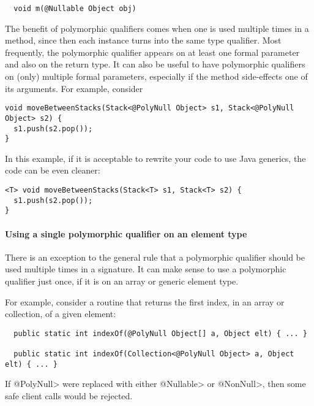 \begin{Verbatim}
  void m(@Nullable Object obj)
\end{Verbatim}

The benefit of polymorphic qualifiers comes when one is used multiple times
in a method, since then each instance turns into the same type qualifier.
Most frequently, the polymorphic qualifier appears on at least one formal
parameter and also on the return type.  It can also be useful to have
polymorphic qualifiers on (only) multiple formal parameters, especially if
the method side-effects one of its arguments.
For example, consider

\begin{Verbatim}
void moveBetweenStacks(Stack<@PolyNull Object> s1, Stack<@PolyNull Object> s2) {
  s1.push(s2.pop());
}
\end{Verbatim}

\noindent
In this example, if it is acceptable to rewrite your code to use Java
generics, the code can be even cleaner:

\begin{Verbatim}
<T> void moveBetweenStacks(Stack<T> s1, Stack<T> s2) {
  s1.push(s2.pop());
}
\end{Verbatim}




\paragraph{Using a single polymorphic qualifier on an element type\label{qualifier-polymorphism-element-types}}

There is an exception to the general rule that a polymorphic qualifier
should be used multiple times in a signature.  It can make sense to use a
polymorphic qualifier just once, if it is on an array or generic element
type.

For example, consider a routine that returns the first index, in an array
or collection, of a given element:

\begin{Verbatim}
  public static int indexOf(@PolyNull Object[] a, Object elt) { ... }

  public static int indexOf(Collection<@PolyNull Object> a, Object elt) { ... }
\end{Verbatim}

If \<@PolyNull> were replaced with either \<@Nullable> or \<@NonNull>, then
some safe client calls would be rejected.

